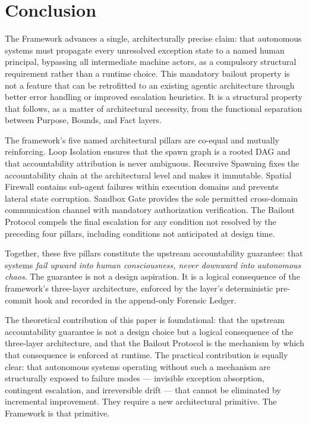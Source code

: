 \section{Conclusion}\label{sec:conclusion}

The \bxthree{} Framework advances a single, architecturally precise claim: that
autonomous systems must propagate every unresolved exception state to a named
human principal, bypassing all intermediate machine actors, as a compulsory
structural requirement rather than a runtime choice.  This mandatory bailout
property is not a feature that can be retrofitted to an existing agentic
architecture through better error handling or improved escalation heuristics.
It is a structural property that follows, as a matter of architectural
necessity, from the functional separation between Purpose, Bounds, and Fact
layers.

The framework's five named architectural pillars are co-equal and mutually
reinforcing.  Loop Isolation ensures that the spawn graph is a rooted DAG and
that accountability attribution is never ambiguous.  Recursive Spawning fixes the
accountability chain at the architectural level and makes it immutable.
Spatial Firewall contains sub-agent failures within execution domains and
prevents lateral state corruption.  Sandbox Gate provides the sole permitted
cross-domain communication channel with mandatory authorization verification.
The Bailout Protocol compels the final escalation for any condition not resolved
by the preceding four pillars, including conditions not anticipated at design
time.

Together, these five pillars constitute the upstream accountability guarantee:
that \bxthree{} systems \emph{fail upward into human consciousness, never
downward into autonomous chaos}.  The guarantee is not a design aspiration.
It is a logical consequence of the framework's three-layer architecture, enforced
by the \fact{} layer's deterministic pre-commit hook and recorded in the
append-only Forensic Ledger.

The theoretical contribution of this paper is foundational: that the upstream
accountability guarantee is not a design choice but a logical consequence of the
three-layer architecture, and that the Bailout Protocol is the mechanism by
which that consequence is enforced at runtime.  The practical contribution is
equally clear: that autonomous systems operating without such a mechanism are
structurally exposed to failure modes --- invisible exception absorption,
contingent escalation, and irreversible drift --- that cannot be eliminated by
incremental improvement.  They require a new architectural primitive.  The
\bxthree{} Framework is that primitive.


